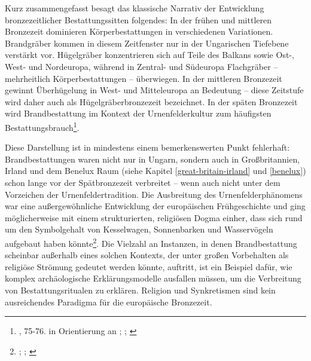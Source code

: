 \documentclass[openany,twoside,twocolumn]{book}
\let\rmarkdownfootnote\footnote%
\def\footnote{\protect\rmarkdownfootnote}
\begin{document}
Kurz zusammengefasst besagt das klassische Narrativ der Entwicklung bronzezeitlicher Bestattungssitten folgendes: In der frühen und mittleren Bronzezeit dominieren Körperbestattungen in verschiedenen Variationen. Brandgräber kommen in diesem Zeitfenster nur in der Ungarischen Tiefebene verstärkt vor. Hügelgräber konzentrieren sich auf Teile des Balkans sowie Ost-, West- und Nordeuropa, während in Zentral- und Südeuropa Flachgräber -- mehrheitlich Körperbestattungen -- überwiegen. In der mittleren Bronzezeit gewinnt Überhügelung in West- und Mitteleuropa an Bedeutung -- diese Zeitstufe wird daher auch als Hügelgräberbronzezeit bezeichnet. In der späten Bronzezeit wird Brandbestattung im Kontext der Urnenfelderkultur zum häufigsten Bestattungsbrauch\footnote{\textcite{harding_european_2000}, 75-76. in Orientierung an \textcite{hausler_bestattungssitten_1977}; \textcite{hausler_grab-_1994}; \textcite{hausler_totenorientierung_1996}}.

Diese Darstellung ist in mindestens einem bemerkenswerten Punkt fehlerhaft: Brandbestattungen waren nicht nur in Ungarn, sondern auch in Großbritannien, Irland und dem Benelux Raum (siehe Kapitel \ref{great-britain-irland} und \ref{benelux}) schon lange vor der Spätbronzezeit verbreitet -- wenn auch nicht unter dem Vorzeichen der Urnenfeldertradition. Die Ausbreitung des Urnenfelderphänomens war eine außergewöhnliche Entwicklung der europäischen Frühgeschichte und ging möglicherweise mit einem strukturierten, religiösen Dogma einher, dass sich rund um den Symbolgehalt von Kesselwagen, Sonnenbarken und Wasservögeln aufgebaut haben könnte\footnote{\textcite{bilic_swan_2016}; \textcite{kimmig_seevolkerbewegung_1964}; \textcite{molloy_european_2018}}. Die Vielzahl an Instanzen, in denen Brandbestattung scheinbar außerhalb eines solchen Kontexts, der unter großen Vorbehalten als religiöse Strömung gedeutet werden könnte, auftritt, ist ein Beispiel dafür, wie komplex archäologische Erklärungsmodelle ausfallen müssen, um die Verbreitung von Bestattungsritualen zu erklären. Religion und Synkretismen sind kein ausreichendes Paradigma für die europäische Bronzezeit.
\end{document}
